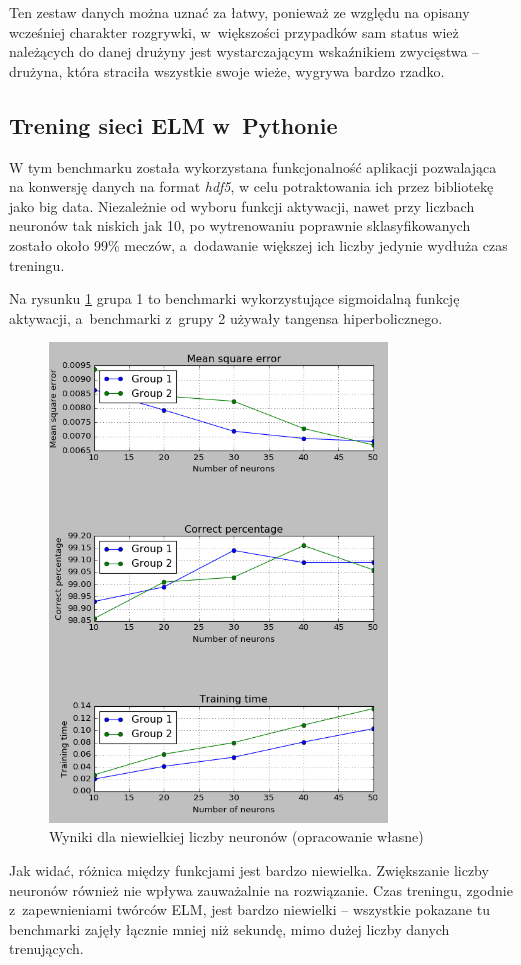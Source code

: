 \documentclass[pl]{minipw} %
\begin{document}
Ten zestaw danych można uznać za łatwy, ponieważ ze względu na opisany wcześniej charakter rozgrywki, w~większości przypadków sam status wież należących do danej drużyny jest wystarczającym wskaźnikiem zwycięstwa -- drużyna, która straciła wszystkie swoje wieże, wygrywa bardzo rzadko.
\subsection{Trening sieci ELM w~Pythonie}
W tym benchmarku została wykorzystana funkcjonalność aplikacji pozwalająca na konwersję danych na format \textit{hdf5}, w celu potraktowania ich przez bibliotekę jako big data. Niezależnie od wyboru funkcji aktywacji, nawet przy liczbach neuronów tak niskich jak 10, po wytrenowaniu poprawnie sklasyfikowanych zostało około 99\% meczów, a~dodawanie większej ich liczby jedynie wydłuża czas treningu. 
\label{python-dota}

Na rysunku \ref{wyniki_dota2_python} grupa 1 to benchmarki wykorzystujące sigmoidalną funkcję aktywacji, a~benchmarki z~grupy 2 używały tangensa hiperbolicznego.

\begin{figure}[H]
\centering
\includegraphics[width=0.8\textwidth]{wyniki_dota2_python.png}
\caption[Wyniki dla niewielkiej liczby neuronów]{Wyniki dla niewielkiej liczby neuronów (opracowanie własne)}
\label{wyniki_dota2_python}
\end{figure}
Jak widać, różnica między funkcjami jest bardzo niewielka. Zwiększanie liczby neuronów również nie wpływa zauważalnie na rozwiązanie. Czas treningu, zgodnie z~zapewnieniami twórców ELM, jest bardzo niewielki -- wszystkie pokazane tu benchmarki zajęły łącznie mniej niż sekundę, mimo dużej liczby danych trenujących. 
\end{document}
